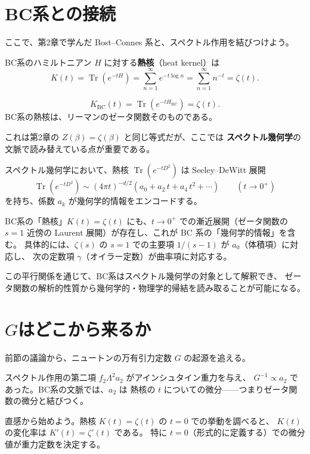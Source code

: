 \documentclass[11pt,a4paper]{article}
\theoremstyle{definition}
\newcommand{\Tr}{\operatorname{Tr}}
\begin{document}
\section{BC系との接続}
\label{sec:3.4}

ここで、第2章で学んだ Bost--Connes 系と、スペクトル作用を結びつけよう。

BC系のハミルトニアン $H$ に対する\textbf{熱核}（heat kernel）は
\[
  K(t) = \Tr(e^{-tH}) = \sum_{n=1}^{\infty} e^{-t\log n}
       = \sum_{n=1}^{\infty} n^{-t} = \zeta(t).
\]

\begin{keybox}[BC系の熱核 $=$ ゼータ関数]
\[
  K_{\mathrm{BC}}(t) = \Tr(e^{-tH_{\mathrm{BC}}}) = \zeta(t).
\]
BC系の熱核は、リーマンのゼータ関数そのものである。
\end{keybox}

これは第2章の $Z(\beta) = \zeta(\beta)$ と同じ等式だが、ここでは
\textbf{スペクトル幾何学}の文脈で読み替えている点が重要である。

スペクトル幾何学において、熱核 $\Tr(e^{-tD^2})$ は Seeley--DeWitt 展開
\[
  \Tr(e^{-tD^2}) \sim (4\pi t)^{-d/2}\left(a_0 + a_2\, t + a_4\, t^2 + \cdots\right)
  \qquad (t\to 0^+)
\]
を持ち、係数 $a_k$ が幾何学的情報をエンコードする。

BC系の「熱核」$K(t) = \zeta(t)$ にも、$t\to 0^+$ での漸近展開（ゼータ関数の
$s=1$ 近傍の Laurent 展開）が存在し、これが BC 系の「幾何学的情報」を含む。
具体的には、$\zeta(s)$ の $s=1$ での主要項 $1/(s-1)$ が $a_0$（体積項）に対応し、
次の定数項 $\gamma$（オイラー定数）が曲率項に対応する。

この平行関係を通じて、BC系はスペクトル幾何学の対象として解釈でき、
ゼータ関数の解析的性質から幾何学的・物理学的帰結を読み取ることが可能になる。

\section{$G$はどこから来るか}
\label{sec:3.5}

前節の議論から、ニュートンの万有引力定数 $G$ の起源を追える。

スペクトル作用の第二項 $f_2\Lambda^2 a_2$ がアインシュタイン重力を与え、
$G^{-1} \propto a_2$ であった。BC系の文脈では、$a_2$ は
熱核の $t$ についての微分——つまりゼータ関数の微分と結びつく。

直感から始めよう。熱核 $K(t) = \zeta(t)$ の $t = 0$ での挙動を調べると、
$K(t)$ の変化率は $K'(t) = \zeta'(t)$ である。
特に $t = 0$（形式的に定義する）での微分値が重力定数を決定する。
\end{document}
